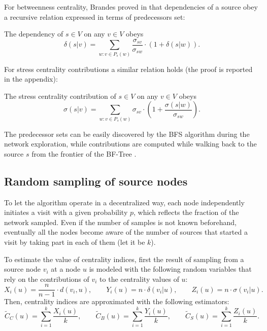 For betweenness centrality, Brandes proved in \cite{brandes2001} that dependencies of a source obey a recursive relation expressed in terms of predecessors set:
\begin{theorem}[Brandes, 2001]
\label{th:contrib:bc}
The dependency of $s \in V$ on any $v \in V$ obeys
\begin{equation} \label{eq:th:contrib:bc}
\delta(s|v) = \sum_{w : v \in P_s(w)} \frac{\sigma_{sv}}{\sigma_{sw}} \cdot (1 + \delta(s|w)) .
\end{equation}
\end{theorem}
For stress centrality contributions a similar relation holds (the proof is reported in the appendix):
\begin{theorem}
\label{th:contrib:sc}
The stress centrality contribution of $s \in V$ on any $v \in V$ obeys
\begin{equation} \label{eq:th:contrib:sc}
\sigma(s|v) = \sum_{w : v \in P_s(w)} \sigma_{sv} \cdot \left( 1 + \frac{\sigma(s|w)}{\sigma_{sw}} \right) .
\end{equation}
\end{theorem}

The predecessor sets can be easily discovered by the BFS algorithm during the network exploration, while contributions are computed while walking back to the source $s$ from the frontier of the BF-Tree .

\subsection{Random sampling of source nodes}

To let the algorithm operate in a decentralized way, each node independently initiates a visit with a given probability $p$, which reflects the fraction of the network sampled. Even if the number of samples is not known beforehand, eventually all the nodes become aware of the number of sources that started a visit by taking part in each of them (let it be $k$).

To estimate the value of centrality indices, first the result of sampling from a source node $v_i$ at a node $u$ is modeled with the following random variables that rely on the contributions of $v_i$ to the centrality values of $u$:
\begin{equation*}
X_i(u) = \frac{n}{n-1} \cdot d(v_i,u) , \qquad
Y_i(u) = n \cdot \delta(v_i|u) , \qquad
Z_i(u) = n \cdot \sigma(v_i|u) .
\end{equation*}
Then, centrality indices are approximated with the following estimators:
\begin{equation*}
\widetilde{C}_C(u) = \sum_{i=1}^k \frac{X_i(u)}{k}, \qquad
\widetilde{C}_B(u) = \sum_{i=1}^k \frac{Y_i(u)}{k}, \qquad
\widetilde{C}_S(u) = \sum_{i=1}^k \frac{Z_i(u)}{k} .
\end{equation*}

